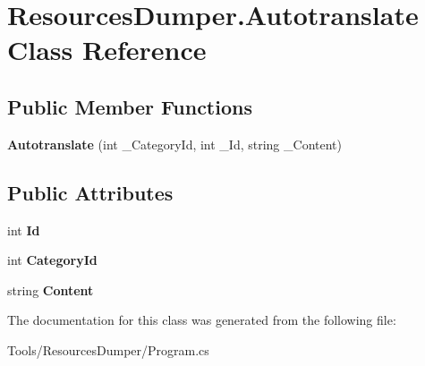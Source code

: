 \hypertarget{class_resources_dumper_1_1_autotranslate}{\section{Resources\-Dumper.\-Autotranslate Class Reference}
\label{class_resources_dumper_1_1_autotranslate}
}
\subsection*{Public Member Functions}
\begin{DoxyCompactItemize}
\item 
\hypertarget{class_resources_dumper_1_1_autotranslate_a795d596f2cd751b81d34183618e249fc}{{\bfseries Autotranslate} (int \-\_\-\-Category\-Id, int \-\_\-\-Id, string \-\_\-\-Content)}\label{class_resources_dumper_1_1_autotranslate_a795d596f2cd751b81d34183618e249fc}

\end{DoxyCompactItemize}
\subsection*{Public Attributes}
\begin{DoxyCompactItemize}
\item 
\hypertarget{class_resources_dumper_1_1_autotranslate_adb62521a2c712b5d60ace4752eccc928}{int {\bfseries Id}}\label{class_resources_dumper_1_1_autotranslate_adb62521a2c712b5d60ace4752eccc928}

\item 
\hypertarget{class_resources_dumper_1_1_autotranslate_aa8d00d94510eb7b7b573965abf061bae}{int {\bfseries Category\-Id}}\label{class_resources_dumper_1_1_autotranslate_aa8d00d94510eb7b7b573965abf061bae}

\item 
\hypertarget{class_resources_dumper_1_1_autotranslate_ae1add12994043a4d4e13ecba35d2978e}{string {\bfseries Content}}\label{class_resources_dumper_1_1_autotranslate_ae1add12994043a4d4e13ecba35d2978e}

\end{DoxyCompactItemize}


The documentation for this class was generated from the following file\-:\begin{DoxyCompactItemize}
\item 
Tools/\-Resources\-Dumper/Program.\-cs\end{DoxyCompactItemize}
